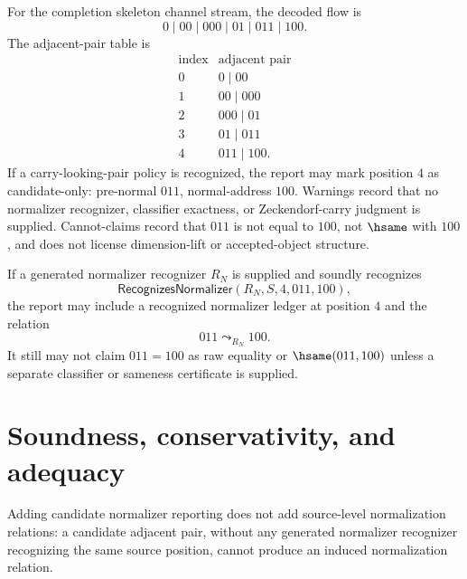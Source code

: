 \begin{example}
\label{ex:source-normalizer-p2-completion-report}
For the completion skeleton channel stream, the decoded flow is
$$
  0\mid 00\mid 000\mid 01\mid 011\mid 100.
$$
The adjacent-pair table is
$$
\begin{array}{c|c}
\text{index} & \text{adjacent pair}\\
\hline
0 & 0\mid 00\\
1 & 00\mid 000\\
2 & 000\mid 01\\
3 & 01\mid 011\\
4 & 011\mid 100.
\end{array}
$$
If a carry-looking-pair policy is recognized, the report may mark position $4$ as candidate-only: pre-normal $011$, normal-address $100$. Warnings record that no normalizer recognizer, classifier exactness, or Zeckendorf-carry judgment is supplied. Cannot-claims record that $011$ is not equal to $100$, not $\hsame$ with $100$, and does not license dimension-lift or accepted-object structure.
\end{example}

\begin{example}
\label{ex:source-normalizer-p2-recognized-report}
If a generated normalizer recognizer $R_N$ is supplied and soundly recognizes
$$
  \mathsf{RecognizesNormalizer}(R_N,S,4,011,100),
$$
the report may include a recognized normalizer ledger at position $4$ and the relation
$$
  011\leadsto_{R_N}100.
$$
It still may not claim $011=100$ as raw equality or $\hsame(011,100)$ unless a separate classifier or sameness certificate is supplied.
\end{example}

\section{Soundness, conservativity, and adequacy}
\label{sec:source-normalizer-soundness-conservativity-adequacy}

\begin{theorem}
\label{thm:source-normalizer-candidate-report-conservative}
Adding candidate normalizer reporting does not add source-level normalization relations: a candidate adjacent pair, without any generated normalizer recognizer recognizing the same source position, cannot produce an induced normalization relation.
\end{theorem}

